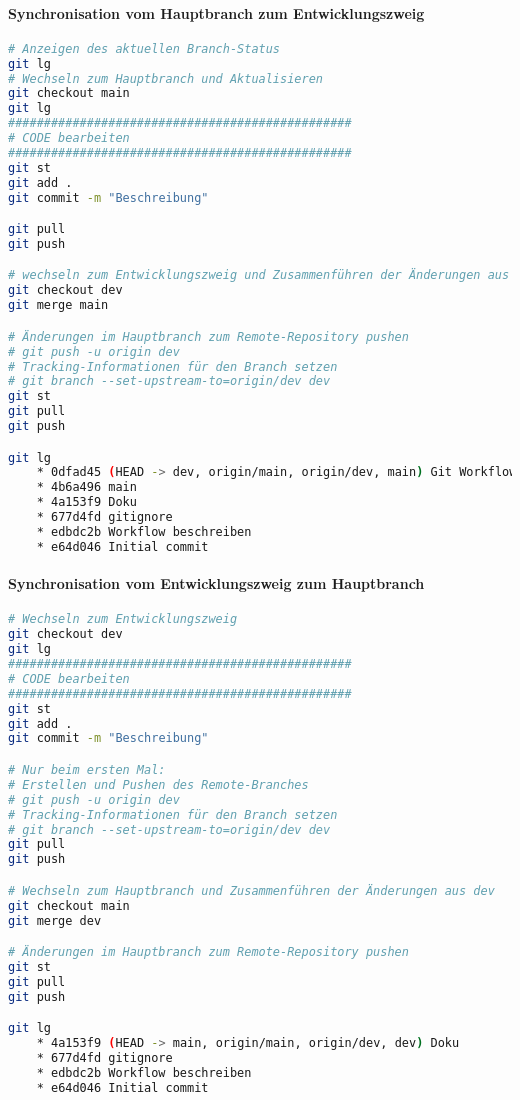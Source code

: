 \documentclass{vorlage-design-main}
\begin{document}
\hypertarget{synchronisation-vom-hauptbranch-zum-entwicklungszweig}{%
\paragraph{Synchronisation vom Hauptbranch zum
Entwicklungszweig}\label{synchronisation-vom-hauptbranch-zum-entwicklungszweig}}

\begin{lstlisting}[language=bash]
# Anzeigen des aktuellen Branch-Status
git lg
# Wechseln zum Hauptbranch und Aktualisieren
git checkout main
git lg
################################################
# CODE bearbeiten
################################################
git st
git add .
git commit -m "Beschreibung"

git pull
git push

# wechseln zum Entwicklungszweig und Zusammenführen der Änderungen aus main
git checkout dev
git merge main

# Änderungen im Hauptbranch zum Remote-Repository pushen
# git push -u origin dev
# Tracking-Informationen für den Branch setzen
# git branch --set-upstream-to=origin/dev dev
git st
git pull
git push

git lg
    * 0dfad45 (HEAD -> dev, origin/main, origin/dev, main) Git Workflow überarbeitet
    * 4b6a496 main
    * 4a153f9 Doku
    * 677d4fd gitignore
    * edbdc2b Workflow beschreiben
    * e64d046 Initial commit
\end{lstlisting}

\hypertarget{synchronisation-vom-entwicklungszweig-zum-hauptbranch}{%
\paragraph{Synchronisation vom Entwicklungszweig zum
Hauptbranch}\label{synchronisation-vom-entwicklungszweig-zum-hauptbranch}}

\begin{lstlisting}[language=bash]
# Wechseln zum Entwicklungszweig
git checkout dev
git lg
################################################
# CODE bearbeiten
################################################
git st
git add .
git commit -m "Beschreibung"

# Nur beim ersten Mal:
# Erstellen und Pushen des Remote-Branches
# git push -u origin dev
# Tracking-Informationen für den Branch setzen
# git branch --set-upstream-to=origin/dev dev
git pull
git push

# Wechseln zum Hauptbranch und Zusammenführen der Änderungen aus dev
git checkout main
git merge dev

# Änderungen im Hauptbranch zum Remote-Repository pushen
git st
git pull
git push

git lg
    * 4a153f9 (HEAD -> main, origin/main, origin/dev, dev) Doku
    * 677d4fd gitignore
    * edbdc2b Workflow beschreiben
    * e64d046 Initial commit
\end{lstlisting}
\end{document}
